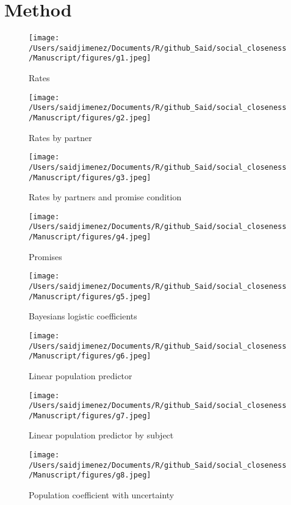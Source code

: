 \documentclass[12pt,]{article}
\begin{document}
\section{Method}\label{method}

\begin{figure}
\centering
\texttt{[image: /Users/saidjimenez/Documents/R/github\_Said/social\_closeness/Manuscript/figures/g1.jpeg]}
\caption{Rates}
\end{figure}

\begin{figure}
\centering
\texttt{[image: /Users/saidjimenez/Documents/R/github\_Said/social\_closeness/Manuscript/figures/g2.jpeg]}
\caption{Rates by partner}
\end{figure}

\begin{figure}
\centering
\texttt{[image: /Users/saidjimenez/Documents/R/github\_Said/social\_closeness/Manuscript/figures/g3.jpeg]}
\caption{Rates by partners and promise condition}
\end{figure}

\begin{figure}
\centering
\texttt{[image: /Users/saidjimenez/Documents/R/github\_Said/social\_closeness/Manuscript/figures/g4.jpeg]}
\caption{Promises}
\end{figure}

\begin{figure}
\centering
\texttt{[image: /Users/saidjimenez/Documents/R/github\_Said/social\_closeness/Manuscript/figures/g5.jpeg]}
\caption{Bayesians logistic coefficients}
\end{figure}

\begin{figure}
\centering
\texttt{[image: /Users/saidjimenez/Documents/R/github\_Said/social\_closeness/Manuscript/figures/g6.jpeg]}
\caption{Linear population predictor}
\end{figure}

\begin{figure}
\centering
\texttt{[image: /Users/saidjimenez/Documents/R/github\_Said/social\_closeness/Manuscript/figures/g7.jpeg]}
\caption{Linear population predictor by subject}
\end{figure}

\begin{figure}
\centering
\texttt{[image: /Users/saidjimenez/Documents/R/github\_Said/social\_closeness/Manuscript/figures/g8.jpeg]}
\caption{Population coefficient with uncertainty}
\end{figure}
\end{document}
